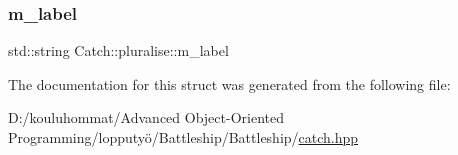 \mbox{\label{struct_catch_1_1pluralise_a8849cbdd3f11ebe7747597c8644e8793}} 
\subsubsection{\texorpdfstring{m\+\_\+label}{m\_label}}
{\footnotesize\ttfamily std\+::string Catch\+::pluralise\+::m\+\_\+label}



The documentation for this struct was generated from the following file\+:\begin{DoxyCompactItemize}
\item 
D\+:/kouluhommat/\+Advanced Object-\/\+Oriented Programming/lopputyö/\+Battleship/\+Battleship/\mbox{\hyperlink{catch_8hpp}{catch.\+hpp}}\end{DoxyCompactItemize}
